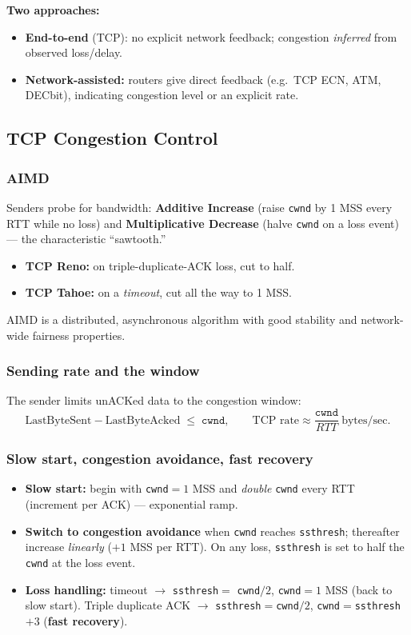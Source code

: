 \documentclass[hidelinks]{article}
\begin{document}
\noindent\textbf{Two approaches:}
\begin{itemize}
    \item \textbf{End-to-end} (TCP): no explicit network feedback; congestion
    \emph{inferred} from observed loss/delay.
    \item \textbf{Network-assisted:} routers give direct feedback
    (e.g.\ TCP ECN, ATM, DECbit), indicating congestion level or an explicit
    rate.
\end{itemize}

\subsection{TCP Congestion Control}

\subsubsection{AIMD}
Senders probe for bandwidth: \textbf{Additive Increase} (raise \texttt{cwnd}
by 1 MSS every RTT while no loss) and \textbf{Multiplicative Decrease}
(halve \texttt{cwnd} on a loss event) --- the characteristic ``sawtooth.''
\begin{itemize}
    \item \textbf{TCP Reno:} on triple-duplicate-ACK loss, cut to half.
    \item \textbf{TCP Tahoe:} on a \emph{timeout}, cut all the way to 1 MSS.
\end{itemize}
AIMD is a distributed, asynchronous algorithm with good stability and
network-wide fairness properties.

\subsubsection{Sending rate and the window}
The sender limits unACKed data to the congestion window:
\[
    \text{LastByteSent} - \text{LastByteAcked} \;\leq\; \texttt{cwnd},
    \qquad \text{TCP rate} \approx \frac{\texttt{cwnd}}{RTT}\ \text{bytes/sec.}
\]

\subsubsection{Slow start, congestion avoidance, fast recovery}
\begin{itemize}
    \item \textbf{Slow start:} begin with \texttt{cwnd}$=1$ MSS and
    \emph{double} \texttt{cwnd} every RTT (increment per ACK) ---
    exponential ramp.
    \item \textbf{Switch to congestion avoidance} when \texttt{cwnd}
    reaches \texttt{ssthresh}; thereafter increase \emph{linearly}
    ($+1$ MSS per RTT). On any loss, \texttt{ssthresh} is set to half the
    \texttt{cwnd} at the loss event.
    \item \textbf{Loss handling:} timeout $\to$ \texttt{ssthresh}$=$
    \texttt{cwnd}$/2$, \texttt{cwnd}$=1$ MSS (back to slow start). Triple
    duplicate ACK $\to$ \texttt{ssthresh}$=$\texttt{cwnd}$/2$,
    \texttt{cwnd}$=$\texttt{ssthresh}$+3$ (\textbf{fast recovery}).
\end{itemize}
\end{document}

